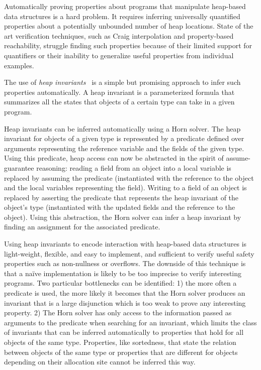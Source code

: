 Automatically proving properties about programs that manipulate heap-based data structures 
is a hard problem. It requires inferring universally
quantified properties about a potentially unbounded number of 
heap locations. State of the art verification techniques, such as Craig 
interpolation and property-based reachability, struggle finding such
properties because of their limited support for quantifiers or their 
inability to generalize useful properties from individual examples. 

The use of \emph{heap invariants}~\cite{jayhorn16} 
is a simple but promising approach to infer such
properties automatically.
A heap invariant is a parameterized formula that summarizes all the
states that objects of a certain type can take in a given program.

Heap invariants can be inferred automatically using a Horn solver. 
The heap invariant for objects of a given type is represented 
by a predicate defined over arguments representing the reference 
variable and the fields of the given
type. Using this predicate, heap access can now be abstracted in the
spirit of assume-guarantee reasoning: reading a field from an
object into a local variable is replaced by assuming the predicate
(instantiated with the reference to the object and the local variables 
representing the field). Writing to a field of an object is replaced by 
asserting the predicate that represents the heap invariant of the
object's type (instantiated with the updated fields and the reference
to the object). Using this abstraction, the Horn solver can infer
a heap invariant by finding an assignment for the associated 
predicate. 

Using heap invariants to encode interaction with heap-based data 
structures is light-weight, flexible, and
easy to implement, and sufficient to verify useful safety properties
such as non-nullness or overflows. The downside of this technique is that a na\"ive 
implementation is
likely to be too imprecise to verify interesting programs. Two particular
bottlenecks can be identified: 1) the more often a predicate is used, the
more likely it becomes that the Horn solver produces an invariant that
is a large disjunction which is too weak 
 to prove any interesting property. 2) The Horn solver has only access to the information passed as
arguments to the predicate when searching for an invariant, which limits 
the class of invariants that can be inferred automatically to properties
that hold for all objects of the same type. Properties, like sortedness,
that state the relation between objects of the same type or properties
that are different for objects depending on their allocation site 
cannot be inferred this way.

